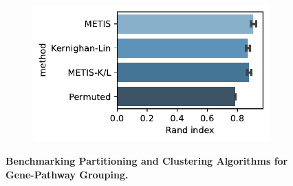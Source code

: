 \begin{figure}[H]
\begin{subfigure}[t]{0.33\textwidth}
    \end{subfigure}
    \begin{subfigure}[t]{0.33\textwidth}
        \caption{}
        \includegraphics[width=\textwidth]{./extended_plots/rand_indices.pdf}        
    \end{subfigure}
    \caption{
        \textbf{Benchmarking Partitioning and Clustering Algorithms for Gene-Pathway Grouping.}\\
    }
    \label{fig:benchmarking_clustering}
\end{figure}
